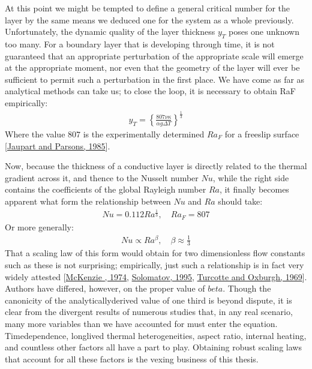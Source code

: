 \documentclass[letterpaper,10pt,english]{jupyterBook}
\begin{document}
\sphinxAtStartPar
At this point we might be tempted to define a general critical  number for the layer by the same means we deduced one for the system as a whole previously. Unfortunately, the dynamic quality of the layer thickness \(y_T\) poses one unknown too many. For a boundary layer that is developing through time, it is not guaranteed that an appropriate perturbation of the appropriate scale will emerge at the appropriate moment, nor even that the geometry of the layer will ever be sufficient to permit such a perturbation in the first place. We have come as far as analytical methods can take us; to close the loop, it is necessary to obtain RaF empirically:
\begin{equation*}
\begin{split} y_T = \left\{ \frac{807 \nu \kappa}{\alpha g \Delta T} \right\} ^{\frac{1}{3}} \end{split}
\end{equation*}
\sphinxAtStartPar
Where the value \(807\) is the experimentally determined \(Ra_F\) for a free\sphinxhyphen{}slip surface {[}\hyperlink{cite.references:id674}{Jaupart and Parsons, 1985}{]}.

\sphinxAtStartPar
Now, because the thickness of a conductive layer is directly related to the thermal gradient across it, and thence to the Nusselt number \(Nu\), while the right side contains the coefficients of the global Rayleigh number \(Ra\), it finally becomes apparent what form the relationship between \(Nu\) and \(Ra\) should take:
\begin{equation*}
\begin{split} Nu = 0.112 Ra^{\frac{1}{3}}, \quad Ra_F = 807 \end{split}
\end{equation*}
\sphinxAtStartPar
Or more generally:
\begin{equation*}
\begin{split} Nu \propto Ra^\beta, \quad \beta \approx \frac{1}{3} \end{split}
\end{equation*}
\sphinxAtStartPar
That a scaling law of this form would obtain for two dimensionless flow constants such as these is not surprising; empirically, just such a relationship is in fact very widely attested {[}\hyperlink{cite.references:id487}{McKenzie , 1974}, \hyperlink{cite.references:id360}{Solomatov, 1995}, \hyperlink{cite.references:id673}{Turcotte and Oxburgh, 1969}{]}. Authors have differed, however, on the proper value of \(beta\). Though the canonicity of the analytically\sphinxhyphen{}derived value of one third is beyond dispute, it is clear from the divergent results of numerous studies that, in any real scenario, many more variables than we have accounted for must enter the equation. Time\sphinxhyphen{}dependence, long\sphinxhyphen{}lived thermal heterogeneities, aspect ratio, internal heating, and countless other factors all have a part to play. Obtaining robust scaling laws that account for all these factors is the vexing business of this thesis.
\end{document}
